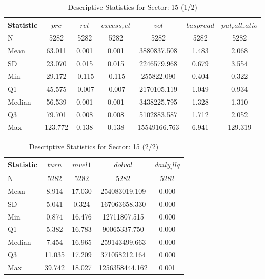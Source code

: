     \begin{table}[H]
    \centering

    
    \caption{Descriptive Statistics for Sector: 15 (1/2)}
    \label{tab:sec15_a}
    
    \begin{tabular}{lcccccc}
    \toprule
    Statistic & $prc$ & $ret$ & $excess_ret$ & $vol$ & $baspread$ & $put_call_ratio$ \\\midrule
    N & 5282 & 5282 & 5282 & 5282 & 5282 & 5282 \\
    Mean & 63.011 & 0.001 & 0.001 & 3880837.508 & 1.483 & 2.068 \\
    SD & 23.070 & 0.015 & 0.015 & 2246579.968 & 0.679 & 3.554 \\
    Min & 29.172 & -0.115 & -0.115 & 255822.090 & 0.404 & 0.322 \\
    Q1 & 45.575 & -0.007 & -0.007 & 2170105.119 & 1.049 & 0.934 \\
    Median & 56.539 & 0.001 & 0.001 & 3438225.795 & 1.328 & 1.310 \\
    Q3 & 79.701 & 0.008 & 0.008 & 5102883.587 & 1.712 & 2.052 \\
    Max & 123.772 & 0.138 & 0.138 & 15549166.763 & 6.941 & 129.319 \\
    \bottomrule
    \end{tabular}

    \end{table}
    
    \begin{table}[H]
    \centering

    
    \caption{Descriptive Statistics for Sector: 15 (2/2)}
    \label{tab:sec15_b}
    
    \begin{tabular}{lcccc}
    \toprule
    Statistic & $turn$ & $mvel1$ & $dolvol$ & $daily_illq$ \\\midrule
    N & 5282 & 5282 & 5282 & 5282 \\
    Mean & 8.914 & 17.030 & 254083019.109 & 0.000 \\
    SD & 5.041 & 0.324 & 167063658.330 & 0.000 \\
    Min & 0.874 & 16.476 & 12711807.515 & 0.000 \\
    Q1 & 5.382 & 16.783 & 90065337.750 & 0.000 \\
    Median & 7.454 & 16.965 & 259143499.663 & 0.000 \\
    Q3 & 11.035 & 17.209 & 371058212.164 & 0.000 \\
    Max & 39.742 & 18.027 & 1256358444.162 & 0.001 \\
    \bottomrule
    \end{tabular}

    \end{table}
    

